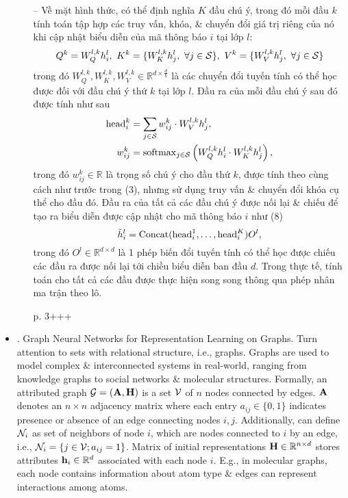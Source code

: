 \documentclass{article}
\begin{document}
\begin{itemize}
\begin{itemize}
        -- Về mặt hình thức, có thể định nghĩa $K$ đầu chú ý, trong đó mỗi đầu $k$ tính toán tập hợp các truy vấn, khóa, \& chuyển đổi giá trị riêng của nó khi cập nhật biểu diễn của mã thông báo $i$ tại lớp $l$:
        \begin{equation*}
            Q^k = W_Q^{l,k}h_i^l,\ K^k = \{W_K^{l,k}h_j^l,\ \forall j\in{\cal S}\},\ V^k = \{W_V^{l,k}h_j^l,\ \forall j\in{\cal S}\}
        \end{equation*}
        trong đó $W_Q^{l,k},W_K^{l,k},W_V^{l,k}\in\mathbb{R}^{d\times\frac{d}{k}}$ là các chuyển đổi tuyến tính có thể học được đối với đầu chú ý thứ $k$ tại lớp $l$. Đầu ra của mỗi đầu chú ý sau đó được tính như sau
        \begin{align*}
            {\rm head}_i^k &= \sum_{j\in{\cal S}} w_{ij}^k\cdot W_V^{l,k}h_j^l,\\
            w_{ij}^k &= {\rm softmax}_{j\in{\cal S}}\left(W_Q^{l,k}h_i^l\cdot W_K^{l,k}h_j^l\right),
        \end{align*}
        trong đó $w_{ij}^k\in\mathbb{R}$ là trọng số chú ý cho đầu thứ $k$, được tính theo cùng cách như trước trong (3), nhưng sử dụng truy vấn \& chuyển đổi khóa cụ thể cho đầu đó. Đầu ra của tất cả các đầu chú ý được nối lại \& chiếu để tạo ra biểu diễn được cập nhật cho mã thông báo $i$ như (8)
        \begin{equation*}
            \tilde{h}_i^l = {\rm Concat}({\rm head}_i^1,\ldots,{\rm head}_i^K)O^l,
        \end{equation*}
        trong đó $O^l\in\mathbb{R}^{d\times d}$ là 1 phép biến đổi tuyến tính có thể học được chiếu các đầu ra được nối lại tới chiều biểu diễn ban đầu $d$. Trong thực tế, tính toán cho tất cả các đầu được thực hiện song song thông qua phép nhân ma trận theo lô.

        p. 3+++
    \end{itemize}
    \item {. Graph Neural Networks for Representation Learning on Graphs.} Turn attention to sets with relational structure, i.e., graphs. Graphs are used to model complex \& interconnected systems in real-world, ranging from knowledge graphs to social networks \& molecular structures. Formally, an attributed graph ${\cal G} = ({\bf A},{\bf H})$ is a set ${\cal V}$ of $n$ nodes connected by edges. ${\bf A}$ denotes an $n\times n$ adjacency matrix where each entry $a_{ij}\in\{0,1\}$ indicates presence or absence of an edge connecting nodes $i,j$. Additionally, can define ${\cal N}_i$ as set of neighbors of node $i$, which are nodes connected to $i$ by an edge, i.e., ${\cal N}_i = \{j\in{\cal V};a_{ij} = 1\}$. Matrix of initial representations ${\bf H}\in\mathbb{R}^{n\times d}$ stores attributes ${\bf h}_i\in\mathbb{R}^d$ associated with each node $i$. E.g., in molecular graphs, each node contains information about atom type \& edges can represent interactions among atoms.


\end{itemize}
\end{document}
